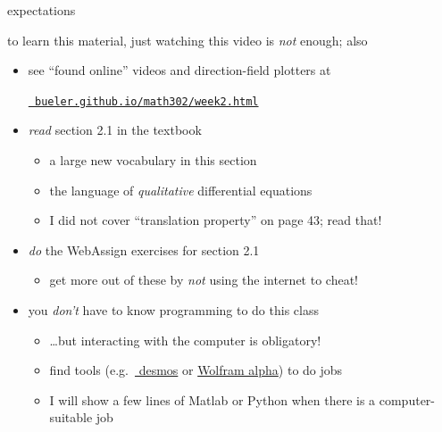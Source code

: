 \documentclass{beamer}
\begin{document}
\begin{frame}{expectations}

to learn this material, just watching this video is \emph{not} enough; also
\begin{itemize}
\item see ``found online'' videos and direction-field plotters at

\centerline{\href{https://bueler.github.io/math302/week2.html}{\tt \color{cyan} bueler.github.io/math302/week2.html}}
\item \emph{read} section 2.1 in the textbook
    \begin{itemize}
    \item a large new vocabulary in this section
    \item the language of \emph{qualitative} differential equations
    \item I did not cover ``translation property'' on page 43; read that!
    \end{itemize}
\item \emph{do} the WebAssign exercises for section 2.1
    \begin{itemize}
    \item get more out of these by \emph{not} using the internet to cheat!
    \end{itemize}
\item you \emph{don't} have to know programming to do this class
    \begin{itemize}
    \item \dots but interacting with the computer is obligatory!
    \item find tools (e.g.~\href{https://www.desmos.com/}{\color{cyan} desmos} or \href{https://www.wolframalpha.com/}{\color{cyan} Wolfram alpha}) to do jobs
    \item I will show a few lines of Matlab or Python when there is a  computer-suitable job
    \end{itemize}
\end{itemize}
\end{frame}
\end{document}

